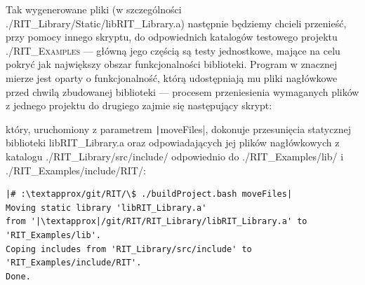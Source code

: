 \small
\noindent{}

Tak wygenerowane pliki (w szczególności \textsf{./RIT\_Library/Static/libRIT\_Library.a}) następnie będziemy chcieli przenieść, przy pomocy innego skryptu, do odpowiednich katalogów testowego projektu \textsc{./RIT\_Examples} --- główną jego częścią są testy jednostkowe, mające na celu pokryć jak największy obszar funkcjonalności biblioteki. Program w znacznej mierze jest oparty o funkcjonalność, którą udostępniają mu pliki nagłówkowe przed chwilą zbudowanej biblioteki --- procesem przeniesienia wymaganych plików z jednego projektu do drugiego zajmie się następujący skrypt:
	
który, uruchomiony z parametrem \texttt|moveFiles|, dokonuje przesunięcia statycznej biblioteki \textsf{libRIT\_Library.a} oraz odpowiadających jej plików nagłówkowych z katalogu \textsf{./RIT\_Library/src/include/} odpowiednio do \textsf{./RIT\_Examples/lib/} i \textsf{./RIT\_Examples/include/RIT/}:

\begin{verbatim}
|# :\textapprox/git/RIT/\$ ./buildProject.bash moveFiles|
Moving static library 'libRIT_Library.a' 
from '|\textapprox|/git/RIT/RIT_Library/libRIT_Library.a' to 'RIT_Examples/lib'.
Coping includes from 'RIT_Library/src/include' to 'RIT_Examples/include/RIT'.
Done.
\end{verbatim}

